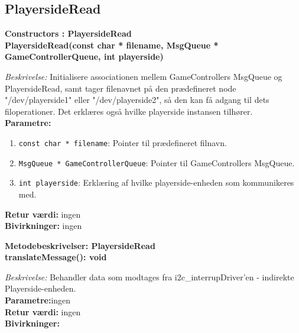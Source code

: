 \documentclass[Softwaredesign/Softwaredesign_main.tex]{subfiles}
\begin{document}
\subsection{PlayersideRead}
{\large\textbf{Constructors : PlayersideRead}}\\[0.2cm]
\textbf{PlayersideRead(const char * filename, MsgQueue * GameControllerQueue, int playerside)}
\begin{adjustwidth}{1cm}{0pt}
\textit{Beskrivelse:} Initialisere associationen mellem GameControllers MsgQueue og PlayersideRead, samt tager filenavnet på den prædefineret node "/dev/playerside1" eller "/dev/playerside2", så den kan få adgang til dets filoperationer. Det erklæres også hvilke playerside instansen tilhører. \\[0.2cm]
\textbf{Parametre:} 
\begin{enumerate}
    \item \lstinline{const char * filename}: Pointer til prædefineret filnavn. 
    \item \lstinline{MsgQueue * GameControllerQueue}: Pointer til GameControllers MsgQueue. 
    \item \lstinline{int playerside}: Erklæring af hvilke playerside-enheden som kommunikeres med. 
\end{enumerate}
\textbf{Retur værdi:} ingen \\[0.2cm]
\textbf{Bivirkninger:} ingen \\[0.2cm]
\end{adjustwidth}

{\large\textbf{Metodebeskrivelser: PlayersideRead}}\\[0.2cm]
\textbf{translateMessage(): void}
\begin{adjustwidth}{1cm}{0pt}
\textit{Beskrivelse:} Behandler data som modtages fra i2c\_interrupDriver'en - indirekte Playerside-enheden.\\[0.2cm]
\textbf{Parametre:}ingen \\[0.2cm]
\textbf{Retur værdi:} ingen \\[0.2cm]
\textbf{Bivirkninger:} \\[0.2cm]
\end{adjustwidth}
\end{document}
